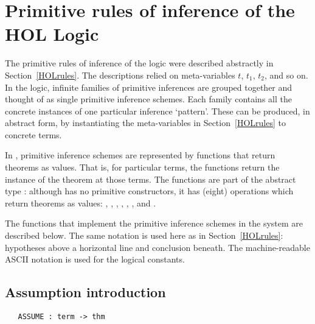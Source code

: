 \section{Primitive rules of inference of the HOL Logic}
\label{rules}

The primitive rules of inference of the logic were described abstractly
in Section~\ref{HOLrules}. The descriptions relied on meta-variables
$t$, $t_1$, $t_2$, and so on.
In the \HOL{} logic, infinite families of primitive
inferences are grouped together and thought of as single primitive inference
schemes.  Each family contains all the concrete instances of one
particular inference `pattern'. These can be produced, in
abstract form, by instantiating the meta-variables in Section~\ref{HOLrules}
to concrete terms.

In \HOL, primitive inference schemes are represented by \ML{} functions
that return theorems as values.  That is, for particular \HOL{} terms,
the \ML{} functions return the instance of the theorem at those terms.
The \ML{} functions are part of the \ML{} abstract type
:
%
%
although  has no primitive constructors, it has (eight)
operations which return theorems as values: , ,
, , , ,  and
.
%

The \ML{} functions that implement the primitive inference schemes in the
\HOL{} system are described below.  The same notation
%
%
is used here as in Section~\ref{HOLrules}: hypotheses above a
horizontal line and conclusion
%
 beneath. The machine-readable
{\small ASCII} notation is used for the logical constants.

\subsection{Assumption introduction}
%

\begin{boxed}
\begin{verbatim}
   ASSUME : term -> thm
\end{verbatim}\end{boxed}

